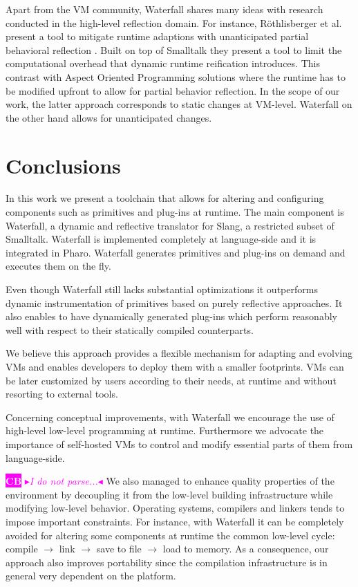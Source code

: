 \documentclass[10pt,preprint,letter]{sigplanconf}
\newcommand{\nbc}[3]{
		{\colorbox{#3}{\bfseries\sffamily\scriptsize\textcolor{white}{#1}}}
 		{\textcolor{#3}{\sf\small$\blacktriangleright$\textit{#2}$\blacktriangleleft$}}}
\newcommand{\nbc}[3]{}
\newcommand{\ST}  {Small\-talk\xspace}
\newcommand{\PH}  {Pharo\xspace}
\newcommand{\W}{Waterfall\xspace}
\newcommand\cb[1]{\nbc{CB}{#1}{magenta}}
\begin{document}
Apart from the VM community, \W shares many ideas with research conducted in the high-level reflection domain.
For instance, Röthlisberger et al.~\cite{Roet07b} present a tool to mitigate runtime adaptions with unanticipated partial behavioral reflection .
Built on top of \ST they present a tool to limit the computational overhead that dynamic runtime reification introduces.
This contrast with Aspect Oriented Programming solutions where the runtime has to be modified upfront to allow for partial behavior reflection.
In the scope of our work, the latter approach corresponds to static changes at VM-level.
\W on the other hand allows for unanticipated changes.


\section{Conclusions}
In this work we present a toolchain that allows for altering and configuring components such as primitives and plug-ins at runtime. 
The main component is \W, a dynamic and reflective translator for Slang, a restricted subset of \ST.
\W is implemented completely at language-side and it is integrated in \PH. 
\W generates primitives and plug-ins on demand and executes them on the fly.
 
Even though \W still lacks substantial optimizations it outperforms dynamic instrumentation of primitives based on purely reflective approaches. It also
enables to have dynamically generated plug-ins which perform reasonably well with respect to their statically compiled counterparts.  

We believe this approach provides a flexible mechanism for adapting and evolving VMs and enables developers to deploy them with a smaller footprints. VMs can be later customized by users according to their needs, at runtime and without resorting to external tools.












Concerning conceptual improvements, with \W we encourage the use of high-level low-level programming at runtime.
Furthermore we advocate the importance of self-hosted VMs to control and modify essential parts of them from language-side.


\cb{I do not parse...}
We also managed to enhance quality properties of the environment by decoupling it from the low-level building infrastructure while modifying low-level behavior. 
Operating systems, compilers and linkers tends to impose important constraints.
For instance, with \W it can be completely avoided for altering some components at runtime the common low-level cycle: compile $\rightarrow$ link $\rightarrow$ save to file $\rightarrow$ load to memory.
 As a consequence, our approach also improves portability since the compilation infrastructure is in general very dependent on the platform.
\end{document}
